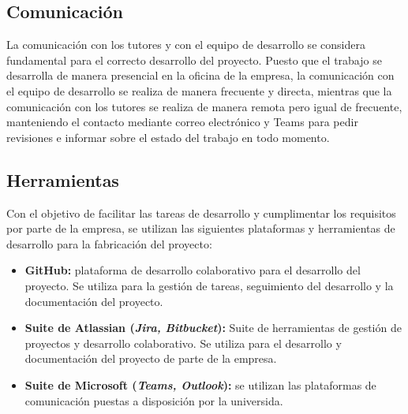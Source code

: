 \subsection{Comunicación}\label{subsec:comunicación}
La comunicación con los tutores y con el equipo de desarrollo se considera
fundamental para el correcto desarrollo del proyecto. Puesto que el trabajo se
desarrolla de manera presencial en la oficina de la empresa, la comunicación con
el equipo de desarrollo se realiza de manera frecuente y directa, mientras que
la comunicación con los tutores se realiza de manera remota pero igual de
frecuente, manteniendo el contacto mediante correo electrónico y Teams para
pedir revisiones e informar sobre el estado del trabajo en todo momento.


\subsection{Herramientas}\label{subsec:herr_planif}
Con el objetivo de facilitar las tareas de desarrollo y cumplimentar los
requisitos por parte de la empresa, se utilizan las siguientes plataformas y
herramientas de desarrollo para la fabricación del proyecto:

\begin{itemize}
	\item \textbf{GitHub:} plataforma de desarrollo colaborativo para el
		desarrollo del proyecto. Se utiliza para la gestión de tareas,
		seguimiento del desarrollo y la documentación del proyecto.
	\item \textbf{Suite de Atlassian (\emph{Jira, Bitbucket}):} Suite de
		herramientas de gestión de proyectos y desarrollo colaborativo. Se
		utiliza para el desarrollo y documentación del proyecto de parte de la
		empresa.
	\item \textbf{Suite de Microsoft (\emph{Teams, Outlook}):} se utilizan las
		plataformas de comunicación puestas a disposición por la universida.
\end{itemize}
